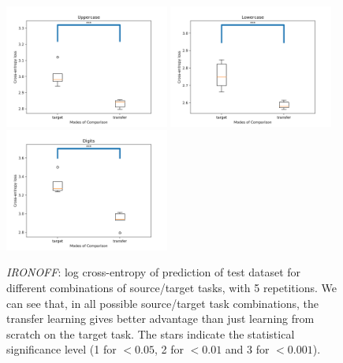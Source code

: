       \begin{figure}
        \centering
          \includegraphics[width=0.48\textwidth]{images/sota/ironoff_results/Uppercase.png}\quad
          \includegraphics[width=0.48\textwidth]{images/sota/ironoff_results/Lowercase.png}\quad
          \includegraphics[width=0.48\textwidth]{images/sota/ironoff_results/Digits.png}
        \caption[\textit{IRONOFF} - log cross-entropy of prediction results for different tasks]{\textit{IRONOFF}: log cross-entropy of prediction of test dataset for different combinations of source/target tasks, with 5 repetitions. We can see that, in all possible source/target task combinations, the transfer learning gives better advantage than just learning from scratch on the target task. The stars indicate the statistical significance level (1 for $<0.05$, 2 for $<0.01$ and 3 for $<0.001$).}
        \label{fig:ironoff_crossentropy}
      \end{figure}

